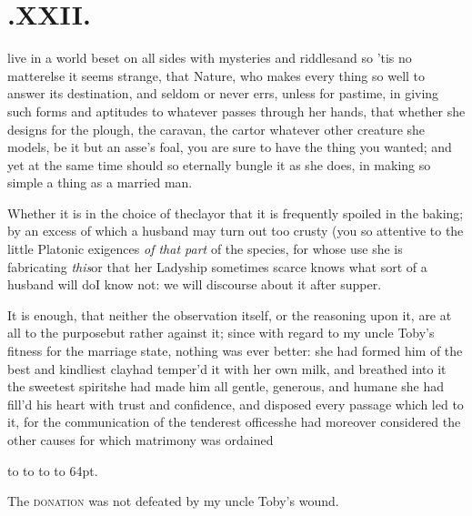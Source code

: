 \documentclass{article}
\begin{document}
\vfill{}\eject
\null{}\baselineskip
\section{.\enspace XXII.}

 live in a world beset on all
sides with mysteries and riddles\tsk and so ’tis no
matter\tsh else it seems strange, that Nature, who makes
every thing so well to answer its destination, and seldom or never
errs, unless for pastime, in giving such forms and aptitudes to
whatever passes through her hands, that whether she designs for the
plough, the caravan, the cart\tsk or whatever other creature she
models, be it but an asse’s foal, you are sure to have the thing you wanted; and
yet at the same time should so eternally bungle it as she does, in\break
making so simple a thing as a married man.

Whether it is in the choice of the\break clay\tsh or that it
is frequently spoiled in the baking; by an excess of which a
husband may turn out too crusty (you\break
{}
so
attentive to the little Platonic exigen\-ces \textit{of that part} of
the species, for whose use she is fabricating
\textit{this}\tsh or that her Ladyship sometimes scarce
knows what sort of a husband will do\tsh I know not: we
will discourse about it after supper.

It is enough, that neither the observation itself, or the reasoning upon it, are at
all to the purpose\tsk but rather against it; since with regard to my uncle
Toby’s fitness for the marriage state, nothing was ever better: she had formed him
of the best and kindliest clay\tsh\break had temper’d it with her own milk, and breathed
into it the sweetest spirit\tsh she had made him all gentle, generous, and humane
\tsh she had fill’d his heart with trust and confidence, and disposed every passage
which led to it, for the communication of the tenderest offices\tsh she had
moreover considered the other causes for which matrimony was ordained\tsh

\noindent
\hbox to 
\hbox to \hsize{\starfill}
\hbox to \hsize{\starfill}
\hbox to 64pt{\starfill .}

The \textsc{donation} was not defeated by my uncle
Toby’s wound.\etp{}
\end{document}
